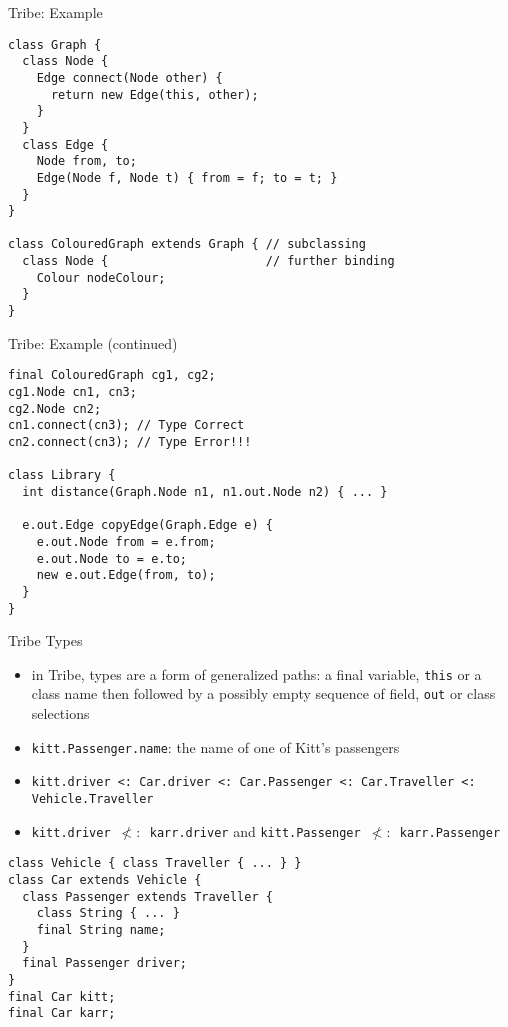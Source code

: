 \documentclass{beamer}
\begin{document}
\begin{frame}[fragile]{Tribe: Example}
\begin{verbatim}
class Graph {
  class Node {
    Edge connect(Node other) {
      return new Edge(this, other);
    }
  }
  class Edge {
    Node from, to;
    Edge(Node f, Node t) { from = f; to = t; }
  }
}

class ColouredGraph extends Graph { // subclassing
  class Node {                      // further binding
    Colour nodeColour;
  }
}
\end{verbatim}
\end{frame}

\begin{frame}[fragile]{Tribe: Example (continued)}
\begin{verbatim}
final ColouredGraph cg1, cg2;
cg1.Node cn1, cn3;
cg2.Node cn2;
cn1.connect(cn3); // Type Correct
cn2.connect(cn3); // Type Error!!!

class Library {
  int distance(Graph.Node n1, n1.out.Node n2) { ... }

  e.out.Edge copyEdge(Graph.Edge e) {
    e.out.Node from = e.from;
    e.out.Node to = e.to;
    new e.out.Edge(from, to);
  }
}
\end{verbatim}
\end{frame}

\begin{frame}[fragile]{Tribe Types}
\begin{itemize}
\item in Tribe, types are a form of generalized paths: a final
  variable, {\tt this} or a class name then followed by a possibly
  empty sequence of field, {\tt out} or class selections
\item {\tt kitt.Passenger.name}: the name of one of Kitt's passengers
\item {\tt kitt.driver <: Car.driver <: Car.Passenger <: Car.Traveller <:
  Vehicle.Traveller}
\item {\tt kitt.driver $\not<:$ karr.driver} and {\tt kitt.Passenger $\not<:$ karr.Passenger}
\end{itemize}
\begin{verbatim}
class Vehicle { class Traveller { ... } }
class Car extends Vehicle {
  class Passenger extends Traveller {
    class String { ... }
    final String name;
  }
  final Passenger driver;
}
final Car kitt;
final Car karr;
\end{verbatim}
\end{frame}
\end{document}
